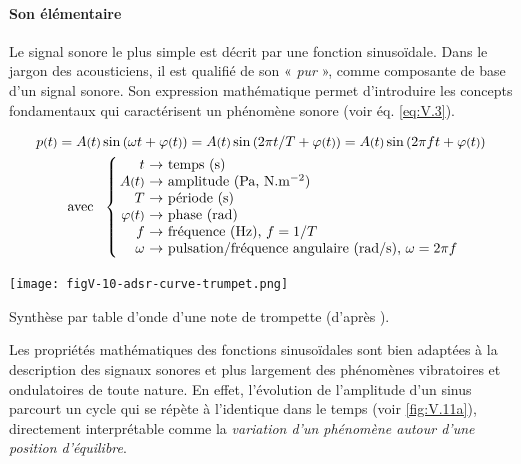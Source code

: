 \paragraph*{Son élémentaire} Le signal sonore le plus simple \nopagebreak est décrit par une fonction sinusoïdale. Dans le jargon des acousticiens, il est qualifié de son « \emph{pur} », comme composante de base d'un signal sonore.
Son expression mathématique permet d'introduire les concepts fondamentaux qui caractérisent un phénomène sonore (voir éq. \ref{eq:V.3}).

\vspace{-\baselineskip}
\begin{equation}
\begin{array}{@{}c@{}}
p\vars{t} = A\vars{t} \sin\var{\omega t + \varphi\vars{t}} = A\vars{t} \sin\var{{2\pi t}/{T} + \varphi\vars{t}}
= A\vars{t} \sin\var{2\pi f t + \varphi\vars{t}} \\[1ex]
\mbox{~avec~~}\left \{ \begin{tabular}[c]{@{\,}r@{~}l@{}}
$t$ $\rightarrow$ & temps (s)\\
$A\vars{t}$ $\rightarrow$ & amplitude (Pa, $\mbox{N}.\mbox{m}^{-2}$)\\
$T$ $\rightarrow$ & période (s)\\
$\varphi\vars{t}$ $\rightarrow$ & phase (rad)\\
$f$ $\rightarrow$ & fréquence (Hz), $f = 1/T$ \\
$\omega$ $\rightarrow$ & pulsation/fréquence angulaire (rad/s), $\omega = 2\pi f$ \\
\end{tabular}\right.
\end{array}
\label{eq:V.3}
\end{equation}
\vspace{-\baselineskip}

\begin{jazzfigure*}
\centering
\texttt{[image: figV-10-adsr-curve-trumpet.png]}
\caption{\label{fig:V.10} Synthèse par table d'onde d'une note de trompette (d'après \cite{Rossing-etal:2002}).}
\end{jazzfigure*}

Les propriétés mathématiques des fonctions sinusoïdales sont bien adaptées à la description des signaux sonores
et plus largement des phénomènes vibratoires et ondulatoires de toute nature. En effet, l'évolution de l'amplitude d'un sinus parcourt un cycle qui se répète à l'identique dans le temps (voir \cref{fig:V.11a}), directement interprétable comme la \emph{variation d'un phénomène autour d'une position d'équilibre}.

